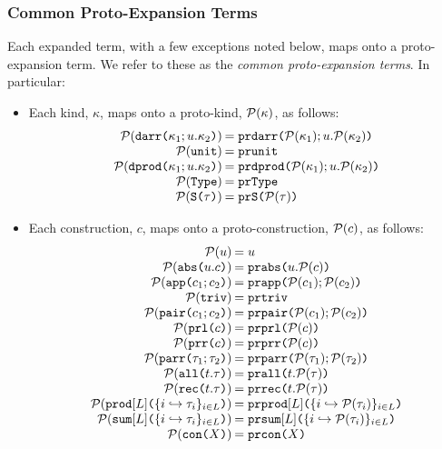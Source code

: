 \subsubsection{Common Proto-Expansion Terms}
Each expanded term, with a few exceptions noted below, maps onto a proto-expansion term. We refer to these as the \emph{common proto-expansion terms}. In particular:
\begin{itemize}
  \item Each kind, $\kappa$, maps onto a proto-kind, $\mathcal{P}(\kappa)$, as follows:
  \[\arraycolsep=1pt\begin{array}{rl}
  \Cof{\akdarr{\kappa_1}{u}{\kappa_2}} & = \acekdarr{\Cof{\kappa_1}}{u}{\Cof{\kappa_2}}\\
  \Cof{\akunit} & = \acekunit\\
  \Cof{\akdbprod{\kappa_1}{u}{\kappa_2}} & = \acekdbprod{\Cof{\kappa_1}}{u}{\Cof{\kappa_2}}\\
  \Cof{\akty} & = \acekty\\
  \Cof{\aksing{\tau}} & = \aceksing{\Cof{\tau}}
  \end{array}\]
  \item Each construction, $c$, maps onto a proto-construction, $\mathcal{P}(c)$, as follows:
  \[\arraycolsep=1pt\begin{array}{rl}
  \Cof{u} & = u\\
  \Cof{\acabs{u}{c}} & = \acecabs{u}{\Cof{c}}\\
  \Cof{\acapp{c_1}{c_2}} & = \acecapp{\Cof{c_1}}{\Cof{c_2}}\\
  \Cof{\actriv} & = \acectriv\\
  \Cof{\acpair{c_1}{c_2}} & = \acecpair{\Cof{c_1}}{\Cof{c_2}}\\
  \Cof{\acprl{c}} & = \acecprl{\Cof{c}}\\
  \Cof{\acprr{c}} & = \acecprr{\Cof{c}}\\
  \Cof{\aparr{\tau_1}{\tau_2}} & = \aceparr{\Cof{\tau_1}}{\Cof{\tau_2}}\\
  \Cof{\aall{t}{\tau}} & = \aceall{t}{\Cof{\tau}}\\
  \Cof{\arec{t}{\tau}} & = \acerec{t}{\Cof{\tau}}\\
  \Cof{\aprod{\labelset}{\mapschema{\tau}{i}{\labelset}}} & = \aceprod{\labelset}{\mapschemax{\Cofv}{\tau}{i}{\labelset}}\\
  \Cof{\asum{\labelset}{\mapschema{\tau}{i}{\labelset}}} & = \acesum{\labelset}{\mapschemax{\Cofv}{\tau}{i}{\labelset}}\\
  \Cof{\amcon{X}} & = \acemcon{X}
  \end{array}\]

\end{itemize}
